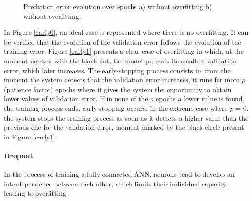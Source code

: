 \begin{figure}[h!]
\captionsetup[subfigure]{position=b}
\centering
{}
\hspace{0.05\textwidth}
\caption{Prediction error evolution over epochs a) without overfitting b) without overfitting.}
\label{early}
\end{figure}

In Figure \ref{early0}, an ideal case is represented where there is no overfitting. It can be verified that the evolution of the validation error follows the evolution of the training error. Figure \ref{early1} presents a clear case of overfitting in which, at the moment marked with the black dot, the model presents its smallest validation error, which later increases. The early-stopping process consists in: from the moment the system detects that the validation error increases, it runs for more $p$ (patience factor) epochs where it gives the system the opportunity to obtain lower values of validation error. If in none of the $p$ epochs a lower value is found, the training process ends, early-stopping occurs. In the extreme case where $p$ = 0, the system stops the training process as soon as it detects a higher value than the previous one for the validation error, moment marked by the black circle present in Figure \ref{early1}.

\paragraph{Dropout}

In the process of training a fully connected \ac{ANN}, neurons tend to develop an interdependence between each other, which limits their individual capacity, leading to overfitting.


